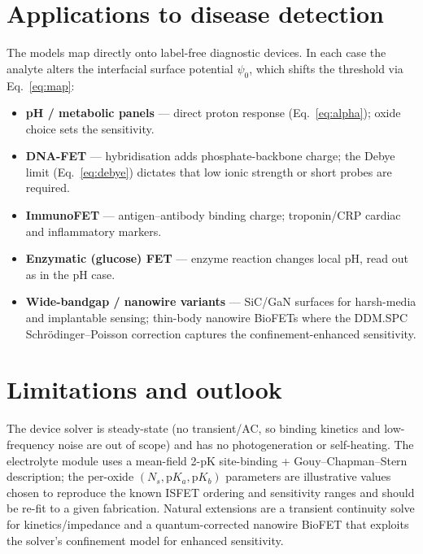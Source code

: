 \documentclass[11pt,a4paper]{article}
\begin{document}
\section{Applications to disease detection}
\label{sec:apps}

The models map directly onto label-free diagnostic devices. In each case the
analyte alters the interfacial surface potential $\psi_0$, which shifts the
threshold via Eq.~\eqref{eq:map}:
\begin{itemize}
  \item \textbf{pH / metabolic panels} --- direct proton response
  (Eq.~\eqref{eq:alpha}); oxide choice sets the sensitivity.
  \item \textbf{DNA-FET} --- hybridisation adds phosphate-backbone charge; the
  Debye limit (Eq.~\eqref{eq:debye}) dictates that low ionic strength or short
  probes are required.
  \item \textbf{ImmunoFET} --- antigen--antibody binding charge; troponin/CRP
  cardiac and inflammatory markers.
  \item \textbf{Enzymatic (glucose) FET} --- enzyme reaction changes local pH,
  read out as in the pH case.
  \item \textbf{Wide-bandgap / nanowire variants} --- SiC/GaN surfaces for
  harsh-media and implantable sensing; thin-body nanowire BioFETs where the
  DDM.SPC Schr\"odinger--Poisson correction captures the confinement-enhanced
  sensitivity.
\end{itemize}

\section{Limitations and outlook}
\label{sec:limits}

The device solver is steady-state (no transient/AC, so binding kinetics and
low-frequency noise are out of scope) and has no photogeneration or self-heating.
The electrolyte module uses a mean-field 2-pK site-binding + Gouy--Chapman--Stern
description; the per-oxide $(N_s,\mathrm{p}K_a,\mathrm{p}K_b)$ parameters are
illustrative values chosen to reproduce the known ISFET ordering and sensitivity
ranges and should be re-fit to a given fabrication. Natural extensions are a
transient continuity solve for kinetics/impedance and a quantum-corrected
nanowire BioFET that exploits the solver's confinement model for enhanced
sensitivity.
\end{document}
